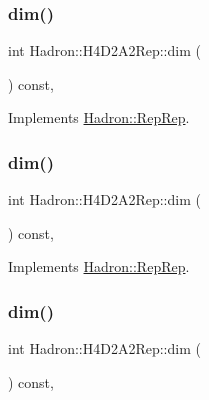 \subsubsection{\texorpdfstring{dim()}{dim()}\hspace{0.1cm}{\footnotesize\ttfamily [3/5]}}
{\footnotesize\ttfamily int Hadron\+::\+H4\+D2\+A2\+Rep\+::dim (\begin{DoxyParamCaption}{ }\end{DoxyParamCaption}) const\hspace{0.3cm}{\ttfamily [inline]}, {\ttfamily [virtual]}}



Implements \mbox{\hyperlink{structHadron_1_1RepRep_a92c8802e5ed7afd7da43ccfd5b7cd92b}{Hadron\+::\+Rep\+Rep}}.

\mbox{\label{structHadron_1_1H4D2A2Rep_a5ed94d218de0113ea027710e08c23684}} 
\subsubsection{\texorpdfstring{dim()}{dim()}\hspace{0.1cm}{\footnotesize\ttfamily [4/5]}}
{\footnotesize\ttfamily int Hadron\+::\+H4\+D2\+A2\+Rep\+::dim (\begin{DoxyParamCaption}{ }\end{DoxyParamCaption}) const\hspace{0.3cm}{\ttfamily [inline]}, {\ttfamily [virtual]}}



Implements \mbox{\hyperlink{structHadron_1_1RepRep_a92c8802e5ed7afd7da43ccfd5b7cd92b}{Hadron\+::\+Rep\+Rep}}.

\mbox{\label{structHadron_1_1H4D2A2Rep_a5ed94d218de0113ea027710e08c23684}} 
\subsubsection{\texorpdfstring{dim()}{dim()}\hspace{0.1cm}{\footnotesize\ttfamily [5/5]}}
{\footnotesize\ttfamily int Hadron\+::\+H4\+D2\+A2\+Rep\+::dim (\begin{DoxyParamCaption}{ }\end{DoxyParamCaption}) const\hspace{0.3cm}{\ttfamily [inline]}, {\ttfamily [virtual]}}



